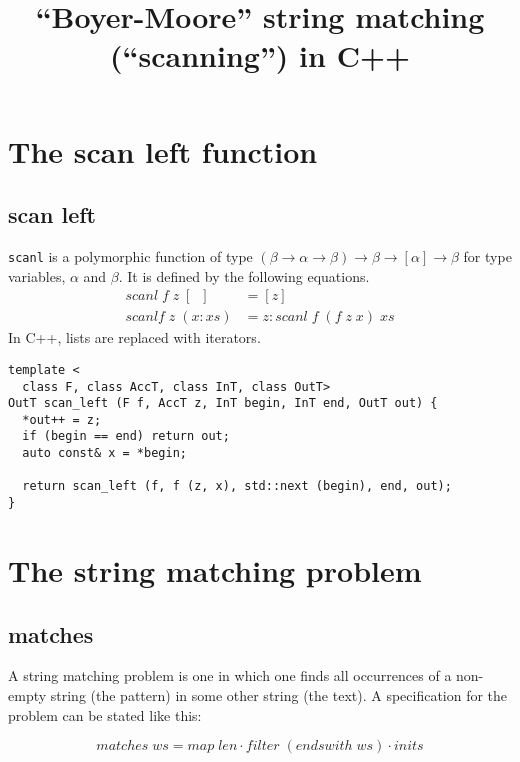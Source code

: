 \documentclass{article}
\title{``Boyer-Moore'' string matching (``scanning'') in C++ }
\begin{document}
\maketitle

\section{The scan left function}

\subsection{scan left}

\verb|scanl| is a polymorphic function of type \((\beta \to \alpha \to
\beta) \to \beta \to [\alpha] \to \beta\) for type variables,
\(\alpha\) and \(\beta\). It is defined by the following equations.
\begin{align*}
scanl\;f\;z\;[\;\;] &= [z] \\
scanlf\;z\;(x : xs) &= z : scanl\;f\;(f\;z\;x)\;xs
\end{align*}
In C++, lists are replaced with iterators.
\begin{verbatim}
template <
  class F, class AccT, class InT, class OutT>
OutT scan_left (F f, AccT z, InT begin, InT end, OutT out) {
  *out++ = z;
  if (begin == end) return out;
  auto const& x = *begin;

  return scan_left (f, f (z, x), std::next (begin), end, out);
}
\end{verbatim}

\section{The string matching problem}

\subsection{matches}
A string matching problem is one in which one finds all occurrences of
a non-empty string (the pattern) in some other string (the text). A
specification for the problem can be stated like this:

\begin{equation}\label{equation:specification}
matches\;ws =map\;len \cdot filter\;(endswith\;ws) \cdot inits
\end{equation}
\end{document}
